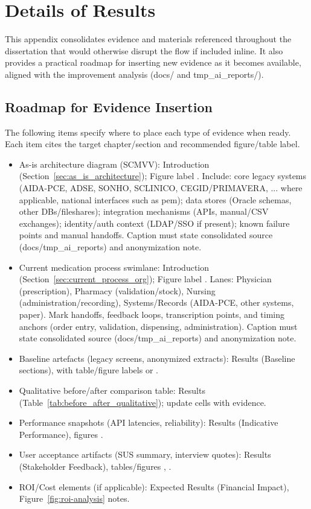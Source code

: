 \chapter{Details of Results}
\label{app:details_results}

This appendix consolidates evidence and materials referenced throughout the dissertation that would otherwise disrupt the flow if included inline. It also provides a practical roadmap for inserting new evidence as it becomes available, aligned with the improvement analysis (docs/ and tmp\_ai\_reports/).

\section{Roadmap for Evidence Insertion}
\begingroup\sloppy
The following items specify where to place each type of evidence when ready. Each item cites the target chapter/section and recommended figure/table label.
\begin{itemize}
    \item As-is architecture diagram (SCMVV): Introduction (Section~\ref{sec:as_is_architecture}); Figure label \texttt{}. Include: core legacy systems (AIDA-PCE, ADSE, SONHO, SCLINICO, CEGID/PRIMAVERA, ... where applicable, national interfaces such as \gls{pem}); data stores (Oracle schemas, other DBs/fileshares); integration mechanisms (APIs, manual/CSV exchanges); identity/auth context (LDAP/SSO if present); known failure points and manual handoffs. Caption must state consolidated source (docs/tmp\_ai\_reports) and anonymization note.
    \item Current medication process swimlane: Introduction (Section~\ref{sec:current_process_org}); Figure label \texttt{}. Lanes: Physician (prescription), Pharmacy (validation/stock), Nursing (administration/recording), Systems/Records (AIDA-PCE, other systems, paper). Mark handoffs, feedback loops, transcription points, and timing anchors (order entry, validation, dispensing, administration). Caption must state consolidated source (docs/tmp\_ai\_reports) and anonymization note.
    \item Baseline artefacts (legacy screens, anonymized extracts): Results (Baseline sections), with table/figure labels \texttt{} or \texttt{}.
    \item Qualitative before/after comparison table: Results (Table~\ref{tab:before_after_qualitative}); update cells with evidence.
    \item Performance snapshots (API latencies, reliability): Results (Indicative Performance), figures \texttt{}.
    \item User acceptance artifacts (SUS summary, interview quotes): Results (Stakeholder Feedback), tables/figures \texttt{}, \texttt{}.
    \item ROI/Cost elements (if applicable): Expected Results (Financial Impact), Figure~\ref{fig:roi-analysis} notes.
\end{itemize}
\endgroup

